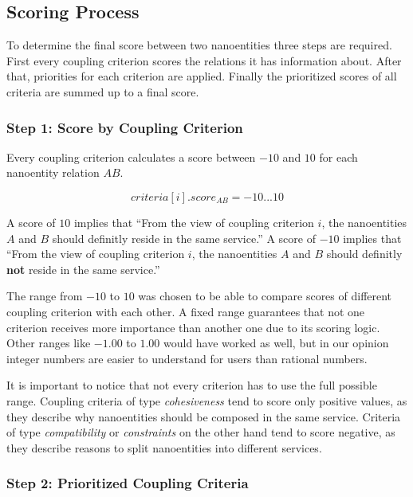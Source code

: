 
\subsection{Scoring Process}

To determine the final score between two nanoentities three steps are required. First every coupling criterion scores the relations it has information about. After that, priorities for each criterion are applied. Finally the prioritized scores of all criteria are summed up to a final score.

\subsubsection{Step 1: Score by Coupling Criterion}

Every coupling criterion calculates a score between $-10$ and $10$ for each nanoentity relation $AB$. 

\begin{displaymath}
criteria[i].score_{AB} = -10 ... 10
\end{displaymath}

A score of $10$ implies that \enquote{From the view of coupling criterion $i$, the nanoentities $A$ and $B$ should definitly reside in the same service.} A score of $-10$ implies that \enquote{From the view of coupling criterion $i$, the nanoentities $A$ and $B$ should definitly \textbf{not} reside in the same service.} 

The range from $-10$ to  $10$ was chosen to be able to compare scores of different coupling criterion with each other. A fixed range guarantees that not one criterion receives more importance than another one due to its scoring logic. Other ranges like $-1.00$ to $1.00$ would have worked as well, but in our opinion integer numbers are easier to understand for users than rational numbers. 

It is important to notice that not every criterion has to use the full possible range. Coupling criteria of type \textit{cohesiveness} tend to score only positive values, as they describe why nanoentities should be composed in the same service. Criteria of type \textit{compatibility} or \textit{constraints} on the other hand tend to score negative, as they describe reasons to split nanoentities into different services.

\subsubsection{Step 2: Prioritized Coupling Criteria}

